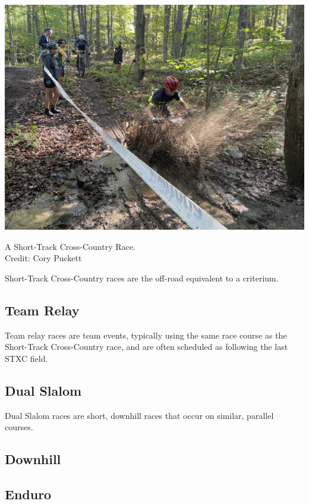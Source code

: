 \documentclass[
  letterpaper, %
  fontsize=10pt, %
  twoside=true,
  chapterentrydots=true, %
  numbers=noenddot,
  fontmethod=tex,
]{kaobook}
\begin{document}
\begin{marginfigure}
\includegraphics{IMG_9720.jpg}
\caption[A Short-Track Cross-Country Race]{A Short-Track Cross-Country Race.\\
          Credit: Cory Puckett}
\end{marginfigure}

Short-Track Cross-Country races are the off-road equivalent
to a criterium. %

\subsection{Team Relay}

Team relay races are team events, typically using the same race course as the Short-Track Cross-Country race, and are often scheduled as following the last STXC field.

\subsection{Dual Slalom}

Dual Slalom races are short, downhill races that occur on similar, parallel courses.

\subsection{Downhill}

\subsection{Enduro}
\end{document}
